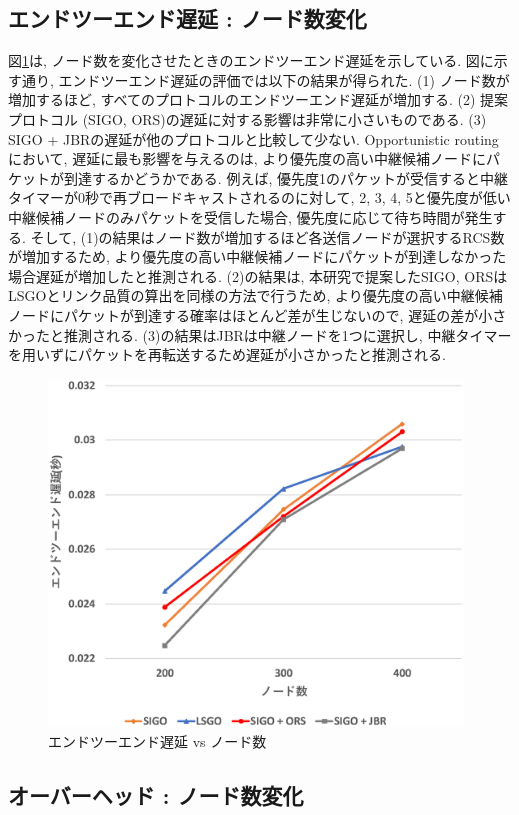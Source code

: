 \documentclass[10pt]{jreport}
\begin{document}
\subsection{エンドツーエンド遅延 : ノード数変化}
図\ref{fig:SIGO_delay_num}は, ノード数を変化させたときのエンドツーエンド遅延を示している.
図に示す通り, エンドツーエンド遅延の評価では以下の結果が得られた.
(1) ノード数が増加するほど, すべてのプロトコルのエンドツーエンド遅延が増加する.
(2) 提案プロトコル (SIGO, ORS)の遅延に対する影響は非常に小さいものである. 
(3) SIGO + JBRの遅延が他のプロトコルと比較して少ない. 
Opportunistic routingにおいて, 遅延に最も影響を与えるのは, より優先度の高い中継候補ノードにパケットが到達するかどうかである. 例えば, 優先度1のパケットが受信すると中継タイマーが0秒で再ブロードキャストされるのに対して, 2, 3, 4, 5と優先度が低い中継候補ノードのみパケットを受信した場合, 優先度に応じて待ち時間が発生する.
そして, (1)の結果はノード数が増加するほど各送信ノードが選択するRCS数が増加するため, より優先度の高い中継候補ノードにパケットが到達しなかった場合遅延が増加したと推測される. 
(2)の結果は, 本研究で提案したSIGO, ORSはLSGOとリンク品質の算出を同様の方法で行うため, より優先度の高い中継候補ノードにパケットが到達する確率はほとんど差が生じないので, 遅延の差が小さかったと推測される. 
(3)の結果はJBRは中継ノードを1つに選択し, 中継タイマーを用いずにパケットを再転送するため遅延が小さかったと推測される. 

\begin{figure}[!ht]
	\centering
	\includegraphics[width=110mm]{figures/SIGO_delay_num.eps}
	\caption{エンドツーエンド遅延 vs ノード数}
	\label{fig:SIGO_delay_num}
\end{figure}

\subsection{オーバーヘッド : ノード数変化}
\end{document}
